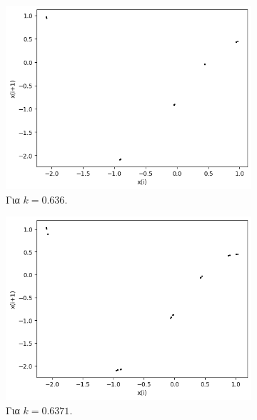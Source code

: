 \begin{figure}[h!]
	\centering
	\begin{subfigure}[b]{0.4\textwidth}
		\centering
		\includegraphics[width=\textwidth]{LateX images/graphs q21/g4}
		\caption{Για $k=0.636$.}
		\label{f:k104}
	\end{subfigure}
	\hfill
	\begin{subfigure}[b]{0.4\textwidth}
		\centering
		\includegraphics[width=\textwidth]{LateX images/graphs q21/g5}
		\caption{Για $k=0.6371$.}
		\label{f:k105}
	\end{subfigure}
	\hfill
	\begin{subfigure}[b]{0.4\textwidth}
		\centering

\end{subfigure}
\end{figure}
